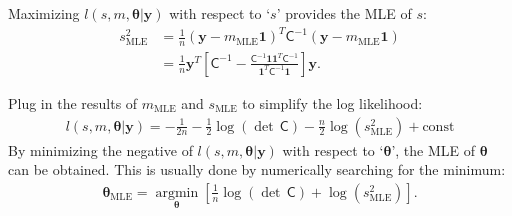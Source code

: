 \documentclass[twocolumn]{svjour3}          %
\newcommand{\bm}[1]{\boldsymbol{#1}}
\newcommand{\vtheta}{{\bm{\theta}}}
\newcommand{\vy}{\bm{y}}
\newcommand{\vone}{\bm{1}}
\newcommand{\mC}{\mathsf{C}}
\newcommand{\mCInv}{{\mathsf{C}^{-1}}}
\newcommand{\MLE}{\text{MLE}}
\providecommand{\argmin}{\operatorname*{argmin}}
\begin{document}
Maximizing $l(s,m,\vtheta | \vy)$ with respect to `$s$' provides the MLE of $s$:
\begin{align}
\label{eqn_s2_MLE}
\nonumber
s^2_{\MLE}  
&= \frac{1}{n} (\vy-m_{\MLE}\vone)^T\mCInv(\vy-m_{\MLE}\vone) 
\\
&= 
\frac{1}{n}
\vy^T 
\left[ 
\mCInv - 
\frac{ \mCInv \vone \vone^T \mCInv }{\vone^T\mCInv \vone}
\right] \vy.
\end{align}

Plug in the results of $m_\MLE$ and $s_\MLE$ to simplify the log likelihood:
\begin{align*}
l(s,m,\vtheta | \vy) 
= -\frac{1}{2n}  - \frac{1}{2} \log(\det\,\mC) - \frac{n}{2} \log(s^2_\MLE) + \text{const}
\end{align*}
By minimizing the negative of $l(s,m,\vtheta | \vy) $ with respect to `$\vtheta$', the MLE of $\vtheta$ can be obtained. This is usually done by numerically searching for the minimum:
\begin{align}
\label{eqn:thetaMLE}
\vtheta_\MLE
= 
\argmin_{\vtheta}
\left[
 \frac{1}{n} \log(\det\, \mC) + 
 \log\left(s^2_\MLE \right) 
\right].
\end{align}
\end{document}
